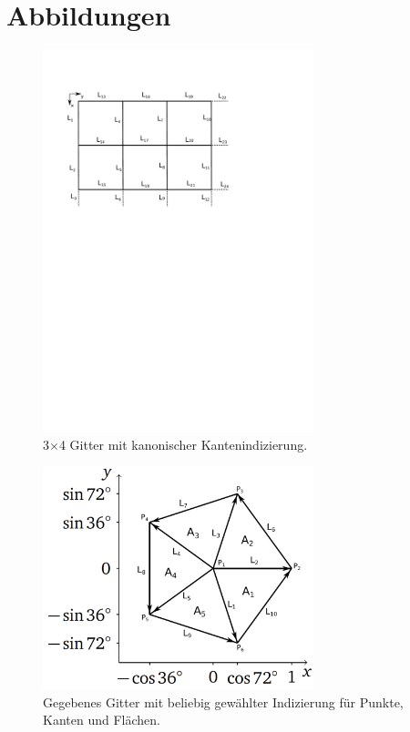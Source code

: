 \documentclass[Protokollheft.tex]{subfiles}
\begin{document}
\section{Abbildungen}
	\begin{figure}[h]
	\centering
	\includegraphics[trim = 10mm 170mm 65mm 20mm, clip, width=0.7\textwidth]{Zeichnung.pdf}
	\caption{3$\times$4 Gitter mit kanonischer Kantenindizierung.}
	\label{Abb:1.1}
\end{figure}
\begin{figure}[htb]
	\centering
	\includegraphics[width=0.7\textwidth]{Raster_2.pdf}
	\caption{Gegebenes Gitter mit beliebig gewählter Indizierung für Punkte, Kanten und Flächen.}
	\label{abb::5-eck}
\end{figure}
\end{document}
